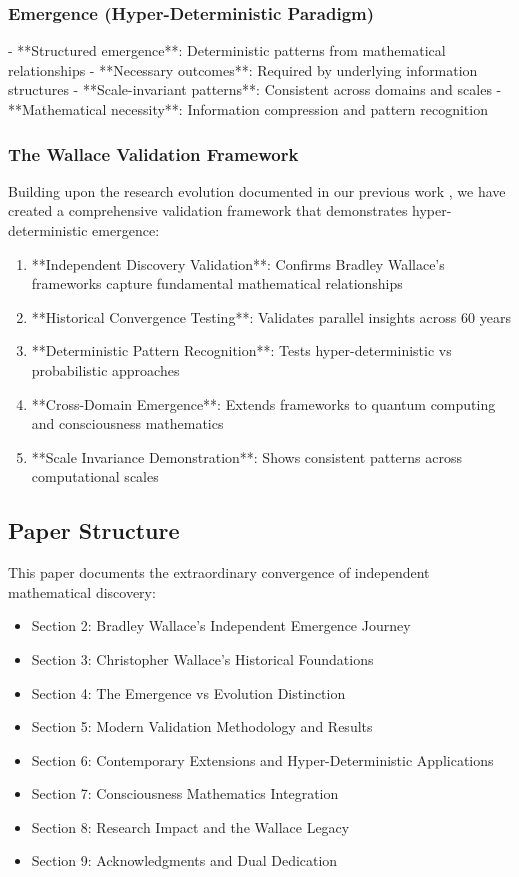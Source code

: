 \documentclass[12pt]{article}
\begin{document}
\subsubsection{Emergence (Hyper-Deterministic Paradigm)}
- **Structured emergence**: Deterministic patterns from mathematical relationships
- **Necessary outcomes**: Required by underlying information structures
- **Scale-invariant patterns**: Consistent across domains and scales
- **Mathematical necessity**: Information compression and pattern recognition

\subsubsection{The Wallace Validation Framework}

Building upon the research evolution documented in our previous work \cite{wallace_research_evolution}, we have created a comprehensive validation framework that demonstrates hyper-deterministic emergence:

\begin{enumerate}
    \item **Independent Discovery Validation**: Confirms Bradley Wallace's frameworks capture fundamental mathematical relationships
    \item **Historical Convergence Testing**: Validates parallel insights across 60 years
    \item **Deterministic Pattern Recognition**: Tests hyper-deterministic vs probabilistic approaches
    \item **Cross-Domain Emergence**: Extends frameworks to quantum computing and consciousness mathematics
    \item **Scale Invariance Demonstration**: Shows consistent patterns across computational scales
\end{enumerate}

\subsection{Paper Structure}

This paper documents the extraordinary convergence of independent mathematical discovery:

\begin{itemize}
    \item Section 2: Bradley Wallace's Independent Emergence Journey
    \item Section 3: Christopher Wallace's Historical Foundations
    \item Section 4: The Emergence vs Evolution Distinction
    \item Section 5: Modern Validation Methodology and Results
    \item Section 6: Contemporary Extensions and Hyper-Deterministic Applications
    \item Section 7: Consciousness Mathematics Integration
    \item Section 8: Research Impact and the Wallace Legacy
    \item Section 9: Acknowledgments and Dual Dedication
\end{itemize}
\end{document}
